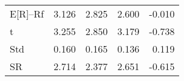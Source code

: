 \begin{tabular}{lrrrr}
\toprule
\midrule
E[R]--Rf & 3.126 & 2.825 & 2.600 & -0.010 \\
t & 3.255 & 2.850 & 3.179 & -0.738 \\
Std & 0.160 & 0.165 & 0.136 & 0.119 \\
SR & 2.714 & 2.377 & 2.651 & -0.615 \\
\bottomrule
\end{tabular}
